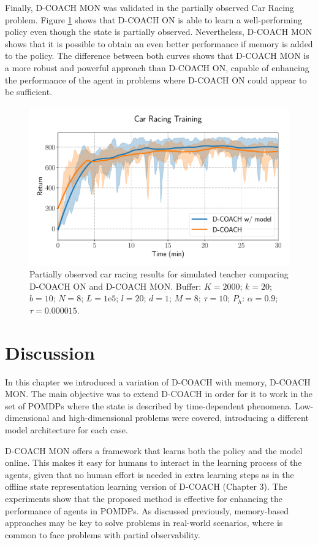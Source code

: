 Finally, D-COACH MON was validated in the partially observed Car Racing problem. Figure \ref{fig:po_cr} shows that D-COACH ON is able to learn a well-performing policy even though the state is partially observed. Nevertheless, D-COACH MON shows that it is possible to obtain an even better performance if memory is added to the policy. The difference between both curves shows that D-COACH MON is a more robust and powerful approach than D-COACH ON, capable of enhancing the performance of the agent in problems where D-COACH ON could appear to be sufficient.

\begin{figure}[h]
    \centering
    \includegraphics[width=0.9\linewidth]{imagenes/cap3/car_racing_lstm.pdf}
    \caption{Partially observed car racing results for simulated teacher comparing D-COACH ON and D-COACH MON.  Buffer: $K = 2000$; $k=20$; $b=10$; $N = 8$; $L=1\mathrm{e}5$; $l=20$; $d=1$; $M=8$; $\tau=10$; $P_{h}$: $\alpha = 0.9$; $\tau = 0.000015$.}
    \label{fig:po_cr}
\end{figure}

\section{Discussion}
In this chapter we introduced a variation of D-COACH with memory, D-COACH MON. The main objective was to extend D-COACH in order for it to work in the set of POMDPs where the state is described by time-dependent phenomena. Low-dimensional and high-dimensional problems were covered, introducing a different model architecture for each case. 

D-COACH MON offers a framework that learns both the policy and the model online. This makes it easy for humans to interact in the learning process of the agents, given that no human effort is needed in extra learning steps as in the offline state representation learning version of D-COACH (Chapter 3). The experiments show that the proposed method is effective for enhancing the performance of agents in POMDPs. As discussed previously, memory-based approaches may be key to solve problems in real-world scenarios, where is common to face problems with partial observability. 

